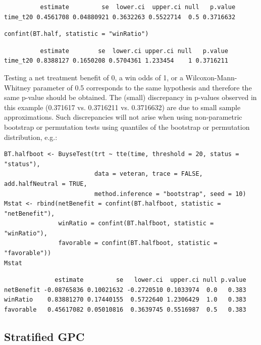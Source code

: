 \documentclass[12pt]{article}
\begin{document}
\begin{verbatim}
          estimate         se  lower.ci  upper.ci null   p.value
time_t20 0.4561708 0.04880921 0.3632263 0.5522714  0.5 0.3716632
\end{verbatim}


\lstset{language=r,label= ,caption= ,captionpos=b,numbers=none}
\begin{lstlisting}
confint(BT.half, statistic = "winRatio")
\end{lstlisting}

\begin{verbatim}
          estimate        se  lower.ci upper.ci null   p.value
time_t20 0.8388127 0.1650208 0.5704361 1.233454    1 0.3716211
\end{verbatim}


Testing a net treatment benefit of 0, a win odds of 1, or a
 Wilcoxon-Mann-Whitney parameter of 0.5 corresponds to the same
 hypothesis and therefore the same p-value should be obtained. The
 (small) discrepancy in p-values observed in this example (0.371617
 vs. 0.3716211 vs. 0.3716632) are due to small sample
 approximations. Such discrepancies will not arise when using
 non-parametric bootstrap or permutation tests using quantiles of the
 bootstrap or permutation distribution, e.g.:
\lstset{language=r,label= ,caption= ,captionpos=b,numbers=none}
\begin{lstlisting}
BT.halfboot <- BuyseTest(trt ~ tte(time, threshold = 20, status = "status"),
                         data = veteran, trace = FALSE, add.halfNeutral = TRUE,
                         method.inference = "bootstrap", seed = 10)
Mstat <- rbind(netBenefit = confint(BT.halfboot, statistic = "netBenefit"),
               winRatio = confint(BT.halfboot, statistic = "winRatio"),
               favorable = confint(BT.halfboot, statistic = "favorable"))
Mstat
\end{lstlisting}

\begin{verbatim}
              estimate         se   lower.ci  upper.ci null p.value
netBenefit -0.08765836 0.10021632 -0.2720510 0.1033974  0.0   0.383
winRatio    0.83881270 0.17440155  0.5722640 1.2306429  1.0   0.383
favorable   0.45617082 0.05010816  0.3639745 0.5516987  0.5   0.383
\end{verbatim}


\clearpage

\subsection{Stratified GPC}
\label{sec:orga85d9cf}
\end{document}
